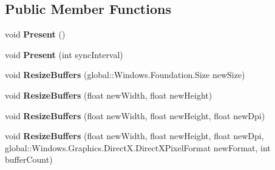 \subsection*{Public Member Functions}
\begin{DoxyCompactItemize}
\item 
\mbox{\label{interface_microsoft_1_1_graphics_1_1_canvas_1_1_i_canvas_swap_chain_a6489739742b77ba79f394f7b1311ac1b}} 
void {\bfseries Present} ()
\item 
\mbox{\label{interface_microsoft_1_1_graphics_1_1_canvas_1_1_i_canvas_swap_chain_a5f5e56503e7a70b7906c91353fd467ab}} 
void {\bfseries Present} (int sync\+Interval)
\item 
\mbox{\label{interface_microsoft_1_1_graphics_1_1_canvas_1_1_i_canvas_swap_chain_ae135e097979c890c9f71993cda7bf5e8}} 
void {\bfseries Resize\+Buffers} (global\+::\+Windows.\+Foundation.\+Size new\+Size)
\item 
\mbox{\label{interface_microsoft_1_1_graphics_1_1_canvas_1_1_i_canvas_swap_chain_abe1c3be982ca2df843e023c1cc00a5e2}} 
void {\bfseries Resize\+Buffers} (float new\+Width, float new\+Height)
\item 
\mbox{\label{interface_microsoft_1_1_graphics_1_1_canvas_1_1_i_canvas_swap_chain_a5307556d0590b5e0fd34934a6dcd76bd}} 
void {\bfseries Resize\+Buffers} (float new\+Width, float new\+Height, float new\+Dpi)
\item 
\mbox{\label{interface_microsoft_1_1_graphics_1_1_canvas_1_1_i_canvas_swap_chain_a55aab11b10079cee86acafefd5965e0a}} 
void {\bfseries Resize\+Buffers} (float new\+Width, float new\+Height, float new\+Dpi, global\+::\+Windows.\+Graphics.\+Direct\+X.\+Direct\+X\+Pixel\+Format new\+Format, int buffer\+Count)
\item 
\mbox{\label{interface_microsoft_1_1_graphics_1_1_canvas_1_1_i_canvas_swap_chain_a3c83b45bda7aaacd98cc90d21075f30c}} 

\end{DoxyCompactItemize}
